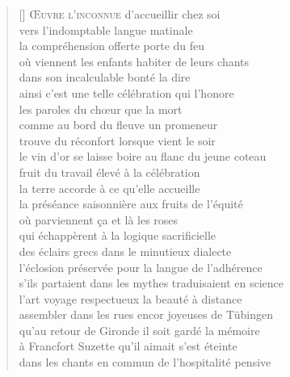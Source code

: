 \documentclass[a4paper, titlepage, twoside, 12pt]{book}
\begin{document}
\vspace*{2cm}
\settowidth{\versewidth}{que la terre accueille à ce qu'elle accorde}
\begin{verse}[\versewidth]
{\lettrine[lines=1]{\textcolor[gray]{0.6}{\OE}}{\space uvre l'inconnue}} d'accueillir chez soi\\
vers l'indomptable langue matinale\\
la compréhension offerte porte du feu\\
où viennent les enfants habiter de leurs chants\\
dans son incalculable bonté la dire\\
ainsi c'est une telle célébration qui l'honore\\
les paroles du ch\oe ur que la mort\\
comme au bord du fleuve un promeneur\\
trouve du réconfort lorsque vient le soir\\
le vin d'or se laisse boire au flanc du jeune coteau\\
fruit du travail élevé à la célébration\\
la terre accorde à ce qu'elle accueille\\
la préséance saisonnière aux fruits de l'équité\\
où parviennent ça et là les roses\\
qui échappèrent à la logique sacrificielle\\
des éclairs grecs dans le minutieux dialecte\\
l'éclosion préservée pour la langue de l'adhérence\\
s'ils partaient dans les mythes traduisaient en science\\
l'art voyage respectueux la beauté à distance\\
assembler dans les rues encor joyeuses de Tübingen\\
qu'au retour de Gironde il soit gardé la mémoire\\
à Francfort Suzette qu'il aimait s'est éteinte\\
dans les chants en commun de l'hospitalité pensive\\
\end{verse}
\end{document}
